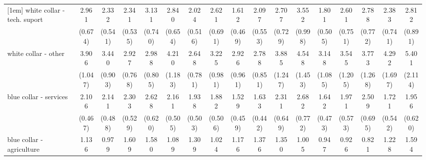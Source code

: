 {\begin{tabular}{l*{16}{c}}
[1em]
white collar - tech. suport&       2.961\sym{***}&       2.332\sym{***}&       2.341\sym{***}&       3.131\sym{***}&       2.840\sym{***}&       2.024\sym{**} &       2.621\sym{***}&       1.612         &       2.097\sym{**} &       2.707\sym{***}&       3.552\sym{***}&       1.801\sym{*}  &       2.601\sym{***}&       2.788\sym{***}&       2.383\sym{**} &       2.812\sym{**} \\
                    &     (0.674)         &     (0.541)         &     (0.535)         &     (0.740)         &     (0.654)         &     (0.516)         &     (0.691)         &     (0.469)         &     (0.553)         &     (0.729)         &     (0.998)         &     (0.505)         &     (0.751)         &     (0.772)         &     (0.741)         &     (0.891)         \\
[1em]
white collar - other&       3.906\sym{***}&       3.440\sym{***}&       2.927\sym{***}&       2.988\sym{***}&       4.210\sym{***}&       2.648\sym{***}&       3.225\sym{***}&       2.926\sym{**} &       2.788\sym{***}&       3.885\sym{***}&       4.548\sym{***}&       3.148\sym{***}&       3.545\sym{***}&       3.773\sym{***}&       4.292\sym{***}&       5.401\sym{***}\\
                    &     (1.047)         &     (0.903)         &     (0.768)         &     (0.805)         &     (1.183)         &     (0.781)         &     (0.981)         &     (0.961)         &     (0.851)         &     (1.247)         &     (1.453)         &     (1.085)         &     (1.205)         &     (1.268)         &     (1.697)         &     (2.114)         \\
[1em]
blue collar - services&       2.106\sym{***}&       2.141\sym{***}&       2.303\sym{***}&       2.628\sym{***}&       2.161\sym{***}&       1.938\sym{*}  &       1.882\sym{*}  &       1.529         &       1.633         &       2.311\sym{**} &       2.682\sym{***}&       1.642         &       1.971\sym{*}  &       2.509\sym{***}&       1.721         &       1.956\sym{*}  \\
                    &     (0.467)         &     (0.488)         &     (0.529)         &     (0.620)         &     (0.505)         &     (0.503)         &     (0.506)         &     (0.459)         &     (0.442)         &     (0.649)         &     (0.772)         &     (0.473)         &     (0.573)         &     (0.695)         &     (0.542)         &     (0.620)         \\
[1em]
blue collar - agriculture&       1.136         &       0.979         &       1.609         &       1.580         &       1.089         &       1.309         &       1.024         &       1.176         &       1.376         &       1.350         &       1.005         &       0.947         &       0.926         &       0.821         &       1.228         &       1.594         \\

\end{tabular}}
